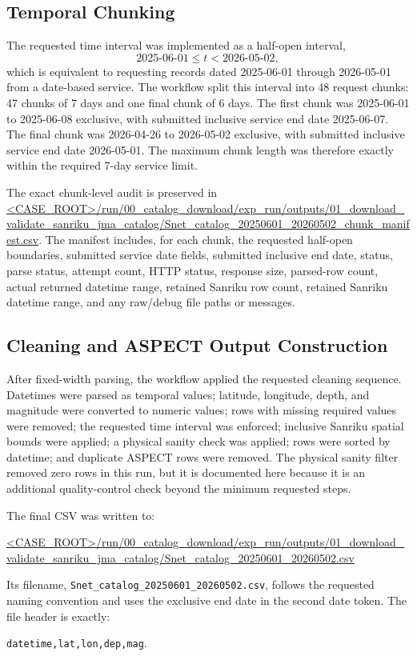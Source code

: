 \documentclass[11pt]{article}
\newcommand{\catalogcsvurl}{\url{<CASE_ROOT>/run/00_catalog_download/exp_run/outputs/01_download_validate_sanriku_jma_catalog/Snet_catalog_20250601_20260502.csv}}
\newcommand{\manifestcsvurl}{\url{<CASE_ROOT>/run/00_catalog_download/exp_run/outputs/01_download_validate_sanriku_jma_catalog/Snet_catalog_20250601_20260502_chunk_manifest.csv}}
\begin{document}
\subsection{Temporal Chunking}

The requested time interval was implemented as a half-open interval,
\[
  \text{2025-06-01} \leq t < \text{2026-05-02},
\]
which is equivalent to requesting records dated 2025-06-01 through 2026-05-01 from a date-based service. The workflow split this interval into 48 request chunks: 47 chunks of 7 days and one final chunk of 6 days. The first chunk was 2025-06-01 to 2025-06-08 exclusive, with submitted inclusive service end date 2025-06-07. The final chunk was 2026-04-26 to 2026-05-02 exclusive, with submitted inclusive service end date 2026-05-01. The maximum chunk length was therefore exactly within the required 7-day service limit.

The exact chunk-level audit is preserved in \manifestcsvurl. The manifest includes, for each chunk, the requested half-open boundaries, submitted service date fields, submitted inclusive end date, status, parse status, attempt count, HTTP status, response size, parsed-row count, actual returned datetime range, retained Sanriku row count, retained Sanriku datetime range, and any raw/debug file paths or messages.

\subsection{Cleaning and ASPECT Output Construction}

After fixed-width parsing, the workflow applied the requested cleaning sequence. Datetimes were parsed as temporal values; latitude, longitude, depth, and magnitude were converted to numeric values; rows with missing required values were removed; the requested time interval was enforced; inclusive Sanriku spatial bounds were applied; a physical sanity check was applied; rows were sorted by datetime; and duplicate ASPECT rows were removed. The physical sanity filter removed zero rows in this run, but it is documented here because it is an additional quality-control check beyond the minimum requested steps.

The final CSV was written to:
\begin{center}
\catalogcsvurl
\end{center}
Its filename, \texttt{Snet\_catalog\_20250601\_20260502.csv}, follows the requested naming convention and uses the exclusive end date in the second date token. The file header is exactly:
\begin{center}
\texttt{datetime,lat,lon,dep,mag}.
\end{center}
\end{document}
